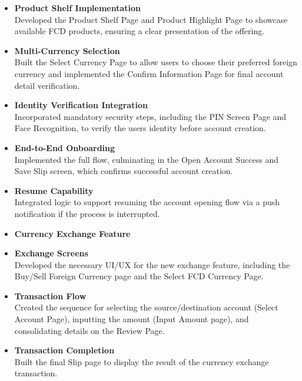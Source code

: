 \begin{itemize}
\item
  \textbf{Product Shelf Implementation\\
  }Developed the Product Shelf Page and Product Highlight Page to
  showcase available FCD products, ensuring a clear presentation of the
  offering.
\item
  \textbf{Multi-Currency Selection\\
  }Built the Select Currency Page to allow users to choose their
  preferred foreign currency and implemented the Confirm Information
  Page for final account detail verification.
\item
  \textbf{Identity Verification Integration\\
  }Incorporated mandatory security steps, including the PIN Screen Page
  and Face Recognition, to verify the user\textquotesingle s identity
  before account creation.
\item
  \textbf{End-to-End Onboarding\\
  }Implemented the full flow, culminating in the Open Account Success
  and Save Slip screen, which confirms successful account creation.
\item
  \textbf{Resume Capability\\
  }Integrated logic to support resuming the account opening flow via a
  push notification if the process is interrupted.
\end{itemize}

\begin{itemize}
\item
  \textbf{Currency Exchange Feature\\
  }
\end{itemize}

\begin{itemize}
\item
  \textbf{Exchange Screens\\
  }Developed the necessary UI/UX for the new exchange feature, including
  the Buy/Sell Foreign Currency page and the Select FCD Currency Page.
\item
  \textbf{Transaction Flow\\
  }Created the sequence for selecting the source/destination account
  (Select Account Page), inputting the amount (Input Amount page), and
  consolidating details on the Review Page.
\item
  \textbf{Transaction Completion\\
  }Built the final Slip page to display the result of the currency
  exchange transaction.
\end{itemize}

